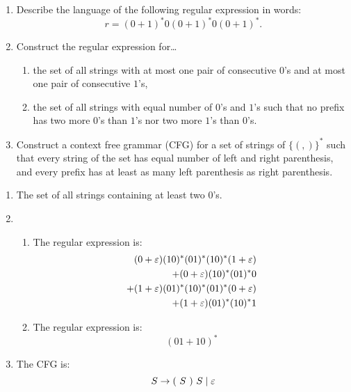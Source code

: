 \begin{exercise}{0}
  \begin{enumerate}
    \item Describe the language of the following regular expression in words:
      \[r= (0+1)^*0(0+1)^*0(0+1)^*.\]
    \item Construct the regular expression for\ldots
      \begin{enumerate}
        \item the set of all strings with at most one pair of consecutive $0$'s and at most one pair of consecutive $1$'s,
        \item the set of all strings with equal number of $0$'s and $1$'s such that no prefix has two more $0$'s than $1$'s nor two more $1$'s than $0$'s.
      \end{enumerate}
    \item Construct a context free grammar (CFG) for a set of strings of $\{(,)\}^*$ such that every string of the set has equal number of left and right parenthesis, and every prefix has at least as many left parenthesis as  right parenthesis.
  \end{enumerate}
\end{exercise}

\begin{solution}
  \begin{enumerate}
    \item The set of all strings containing at least two $0$'s.
    \item
      \begin{enumerate}
        \item The regular expression is: 
          \begin{align*}
          (0+\varepsilon)(10)^*(01)^*(10)^*(1+\varepsilon) \\
          +(0+\varepsilon)(10)^*(01)^*0 \\
          +(1+\varepsilon)(01)^*(10)^*(01)^*(0+\varepsilon) \\
          +(1+\varepsilon)(01)^*(10)^*1 \\
          \end{align*}
	    \item The regular expression is:
          \[(01 + 10)^*\]
      \end{enumerate}
    \item The CFG is:
      \[S \to (\ S \ ) \ S \mid \varepsilon\]
  \end{enumerate}
\end{solution}

